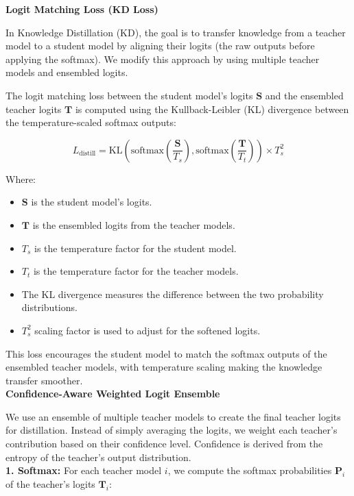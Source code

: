 \documentclass{article}
\begin{document}
 \textbf{Logit Matching Loss (KD Loss)}

In Knowledge Distillation (KD), the goal is to transfer knowledge from a teacher model to a student model by aligning their logits (the raw outputs before applying the softmax). We modify this approach by using multiple teacher models and ensembled logits.


The logit matching loss between the student model's logits \( \mathbf{S} \) and the ensembled teacher logits \( \mathbf{T} \) is computed using the Kullback-Leibler (KL) divergence \cite{hinton2015distilling} between the temperature-scaled softmax outputs:

\[
L_{\text{distill}} = \text{KL}\left( \text{softmax}\left(\frac{\mathbf{S}}{T_s}\right), \text{softmax}\left(\frac{\mathbf{T}}{T_t}\right) \right) \times T_s^2
\]

Where:
\begin{itemize} [itemsep=0.5pt, topsep=1pt]
    \item \( \mathbf{S} \) is the student model's logits.
    \item \( \mathbf{T} \) is the ensembled logits from the teacher models.
    \item \( T_s \) is the temperature factor for the student model.
    \item \( T_t \) is the temperature factor for the teacher models.
    \item The KL divergence measures the difference between the two probability distributions.
    \item \( T_s^2 \) scaling factor is used to adjust for the softened logits.\\
\end{itemize}

This loss encourages the student model to match the softmax outputs of the ensembled teacher models, with temperature scaling making the knowledge transfer smoother.\\

\textbf{Confidence-Aware Weighted Logit Ensemble}

We use an ensemble of multiple teacher models to create the final teacher logits for distillation. Instead of simply averaging the logits, we weight each teacher's contribution based on their confidence level. Confidence is derived from the entropy of the teacher's output distribution.\\

\textbf{1. Softmax:}
For each teacher model \( i \), we compute the softmax probabilities \( \mathbf{P}_i \) of the teacher's logits \( \mathbf{T}_i \):
\end{document}
